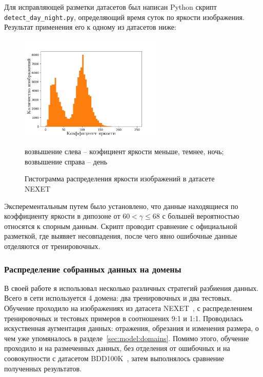 \documentclass[11pt,a4paper]{extarticle}
\begin{document}
{			\noindent
			Для исправляющей разметки датасетов был написан Python скрипт \texttt{detect\_day\_night.py}, определяющий время суток по яркости изображения.
			Результат применения его к одному из датасетов ниже:
			\begin{figure}[ht]
				\centering
				\includegraphics[width=0.6\textwidth]{img/histogram60}
				\caption{Гистограмма распределения яркости изображений в датасете NEXET}{
					\small{
						возвышение слева -- коэфициент яркости меньше, темнее, ночь;
						возвышение справа -- день
					}
				}
				\label{pic:hist_detect}
			\end{figure}

			\noindent
			Эксперементальным путем было установлено, что данные находящиеся по коэффициенту яркости в дипозоне от \(60 < \gamma \le 68\) с большей вероятностью относятся к спорным данным.
			Скрипт проводит сравнение с официальной разметкой, где выявяет несовпадения, после чего явно ошибочные данные отделяются от тренировочных.
			
		

		\subsubsection*{Распределение собранных данных на домены}

			В своей работе я использовал несколько различных стратегий разбиения данных.
			Всего в сети используется 4 домена: два тренировочных и два тестовых.
			Обучение проходило на изображениях из датасета NEXET~\cite{data:nexet}, с распределением тренировочных и тестовых примеров в соотношених 9:1 и 1:1.
			Проводилась искуственная аугментация данных: отражения, обрезания и изменения размера, о чем уже упомяналось в разделе~\ref{sec:model:domains}.
			Помимо этого, обучение проходило и на размеченных данных, без отделения от ошибочных и на соовокупности с датасетом BDD100K~\cite{data:bdd100k}, затем выполнялось сравнение полученных результатов.
			
}
\end{document}
